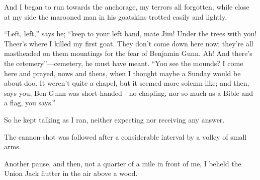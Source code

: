 And I began to run towards the anchorage, my terrors all forgotten, while close at my side the marooned man in his goatskins trotted easily and lightly.

\enquote{Left, left,} says he; \enquote{keep to your left hand, mate Jim! Under the trees with you! Theer’s where I killed my first goat. They don’t come down here now; they’re all mastheaded on them mountings for the fear of Benjamin Gunn. Ah! And there’s the cetemery}---cemetery, he must have meant. \enquote{You see the mounds? I come here and prayed, nows and thens, when I thought maybe a Sunday would be about doo. It weren’t quite a chapel, but it seemed more solemn like; and then, says you, Ben Gunn was short-handed---no chapling, nor so much as a Bible and a flag, you says.}

So he kept talking as I ran, neither expecting nor receiving any answer.

The cannon-shot was followed after a considerable interval by a volley of small arms.

Another pause, and then, not a quarter of a mile in front of me, I beheld the Union Jack flutter in the air above a wood.